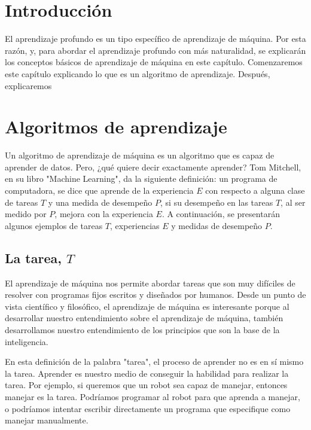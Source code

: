 \section{Introducción}
El aprendizaje profundo es un tipo específico de aprendizaje de máquina. Por esta razón, y, para abordar el aprendizaje profundo con más naturalidad, se explicarán los conceptos básicos de aprendizaje de máquina en este capítulo. Comenzaremos este capítulo explicando lo que es un algoritmo de aprendizaje. Después, explicaremos

\section{Algoritmos de aprendizaje}
Un algoritmo de aprendizaje de máquina es un algoritmo que es capaz de aprender de datos. Pero, ¿qué quiere decir exactamente aprender? Tom Mitchell, en su libro "Machine Learning", da la siguiente definición: un programa de computadora, se dice que aprende de la experiencia $E$ con respecto a alguna clase de tareas $T$ y una medida de desempeño $P$, si su desempeño en las tareas $T$, al ser medido por $P$, mejora con la experiencia $E$. A continuación, se presentarán algunos ejemplos de tareas $T$, experiencias $E$ y medidas de desempeño $P$. \cite{Mitchell:1997:ML:541177}

\subsection{La tarea, $T$}
El aprendizaje de máquina nos permite abordar tareas que son muy difíciles de resolver con programas fijos escritos y diseñados por humanos. Desde un punto de vista científico y filosófico, el aprendizaje de máquina es interesante porque al desarrollar nuestro entendimiento sobre el aprendizaje de máquina, también desarrollamos nuestro entendimiento de los principios que son la base de la inteligencia. \cite{goodfellow-et-al-2016}

\vspace{1em}

En esta definición de la palabra "tarea", el proceso de aprender no es en sí mismo la tarea. Aprender es nuestro medio de conseguir la habilidad para realizar la tarea. Por ejemplo, si queremos que un robot sea capaz de manejar, entonces manejar es la tarea. Podríamos programar al robot para que aprenda a manejar, o podríamos intentar escribir directamente un programa que especifique como manejar manualmente. \cite{goodfellow-et-al-2016} \cite{Mitchell:1997:ML:541177}

